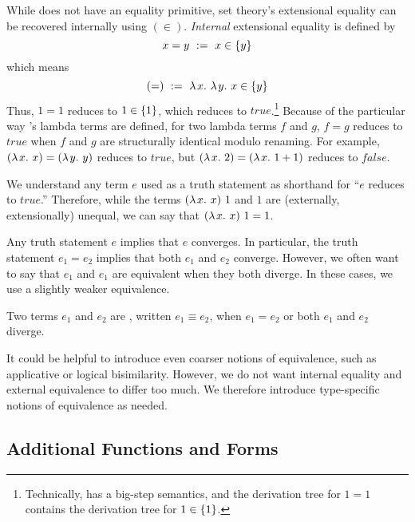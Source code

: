 \documentclass[preprint]{sigplanconf}
\begin{document}
While \lzfclang does not have an equality primitive, set theory's extensional equality can be recovered internally using $(\in)$.
\emph{Internal} extensional equality is defined by
\begin{equation}
	x = y \ := \ x \in \{{y}\}
\end{equation}
which means
\begin{equation}
	(=) \ := \ \lambda\mspace{2mu}{x}\ldotp\,\lambda\mspace{2mu}{y}\ldotp\,{x \in \{{y}\}}
\end{equation}
Thus, $1 = 1$ reduces to $1 \in \{{1}\}$, which reduces to $true$.\footnote{Technically, \lzfclang has a big-step semantics, and
the derivation tree for $1 = 1$ contains the derivation tree for $1 \in \{{1}\}$.}
Because of the particular way \lzfclang's lambda terms are defined, for two lambda terms $f$ and $g$, $f = g$ reduces to $true$ when $f$ and $g$ are structurally identical modulo renaming.
For example, $(\lambda\mspace{2mu}{x}\ldotp\,{x}) = (\lambda\mspace{2mu}{y}\ldotp\,{y})$ reduces to $true$, but $(\lambda\mspace{2mu}{x}\ldotp\,{2}) = (\lambda\mspace{2mu}{x}\ldotp\,{1+1})$ reduces to $false$.

We understand any \lzfclang term $\mathit{e}$ used as a truth statement as shorthand for ``$\mathit{e}$ reduces to $true$.''
Therefore, while the terms $(\lambda\mspace{2mu}{x}\ldotp\,{x})~1$ and $1$ are (externally, extensionally) unequal, we can say that $(\lambda\mspace{2mu}{x}\ldotp\,{x})~1 = 1$.

Any truth statement $\mathit{e}$ implies that $\mathit{e}$ converges.
In particular, the truth statement $\mathit{e}_1 = \mathit{e}_2$ implies that both $\mathit{e}_1$ and $\mathit{e}_2$ converge.
However, we often want to say that $\mathit{e}_1$ and $\mathit{e}_1$ are equivalent when they both diverge.
In these cases, we use a slightly weaker equivalence.

\begin{definition}
Two \lzfclang terms $\mathit{e_1}$ and $\mathit{e_2}$ are , written $\mathit{e_1} \equiv \mathit{e_2}$, when $\mathit{e_1} = \mathit{e_2}$ or both $\mathit{e_1}$ and $\mathit{e_2}$ diverge.
\end{definition}

It could be helpful to introduce even coarser notions of equivalence, such as applicative or logical bisimilarity.
However, we do not want internal equality and external equivalence to differ too much.
We therefore introduce type-specific notions of equivalence as needed.

\subsection{Additional Functions and Forms}
\end{document}
